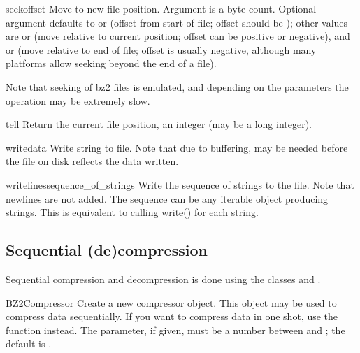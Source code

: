 \begin{methoddesc}[BZ2File]{seek}{offset}
Move to new file position. Argument  is a byte count. Optional
argument  defaults to  or  (offset from start of file;
offset should be ); other values are  or  (move relative to
current position; offset can be positive or negative), and  or  (move relative to end
of file; offset is usually negative, although many platforms allow seeking beyond
the end of a file).

Note that seeking of bz2 files is emulated, and depending on the parameters
the operation may be extremely slow.
\end{methoddesc}

\begin{methoddesc}[BZ2File]{tell}{}
Return the current file position, an integer (may be a long integer).
\end{methoddesc}

\begin{methoddesc}[BZ2File]{write}{data}
Write string  to file. Note that due to buffering, 
may be needed before the file on disk reflects the data written.
\end{methoddesc}

\begin{methoddesc}[BZ2File]{writelines}{sequence_of_strings}
Write the sequence of strings to the file. Note that newlines are not added.
The sequence can be any iterable object producing strings. This is equivalent
to calling write() for each string.
\end{methoddesc}


\subsection{Sequential (de)compression}

Sequential compression and decompression is done using the classes
 and .

\begin{classdesc}{BZ2Compressor}{}
Create a new compressor object. This object may be used to compress
data sequentially. If you want to compress data in one shot, use the
 function instead. The  parameter,
if given, must be a number between  and ; the default
is .
\end{classdesc}


